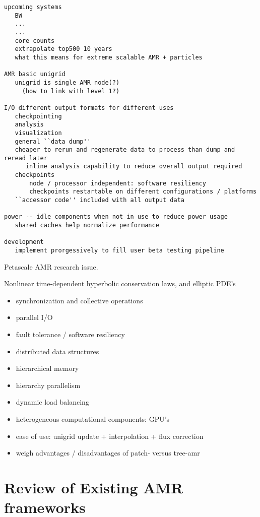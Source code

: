 \documentclass[14pt,letter]{article}
\begin{document}
\begin{verbatim}
upcoming systems
   BW
   ...
   ...
   core counts
   extrapolate top500 10 years
   what this means for extreme scalable AMR + particles

AMR basic unigrid
   unigrid is single AMR node(?)
     (how to link with level 1?)

I/O different output formats for different uses
   checkpointing
   analysis
   visualization
   general ``data dump''
   cheaper to rerun and regenerate data to process than dump and reread later
      inline analysis capability to reduce overall output required
   checkpoints
       node / processor independent: software resiliency
       checkpoints restartable on different configurations / platforms
   ``accessor code'' included with all output data

power -- idle components when not in use to reduce power usage
   shared caches help normalize performance

development
   implement prorgessively to fill user beta testing pipeline

\end{verbatim}

Petascale AMR research issue.


Nonlinear time-dependent hyperbolic conservation laws, and elliptic PDE's

\begin{itemize}
\item synchronization and collective operations
\item parallel I/O
\item fault tolerance / software resiliency
\item distributed data structures
\item hierarchical memory
\item hierarchy parallelism
\item dynamic load balancing
\item heterogeneous computational components: GPU's
\item ease of use: unigrid update + interpolation + flux correction
\item weigh advantages / disadvantages of patch- versus tree-amr
\end{itemize}


\section{Review of Existing AMR frameworks}

\end{document}
